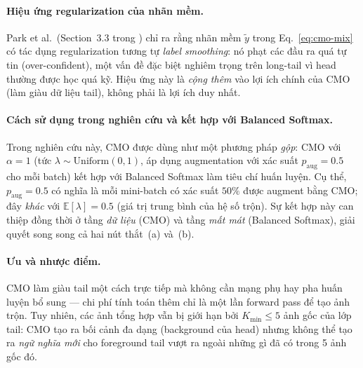 \paragraph{Hiệu ứng regularization của nhãn mềm.}
Park et al.\ (Section~3.3 trong \cite{park2022cmo}) chỉ ra rằng
nhãn mềm $\tilde{y}$ trong Eq.~\eqref{eq:cmo-mix} có tác dụng
regularization tương tự \emph{label smoothing}: nó phạt các đầu ra
quá tự tin (over-confident), một vấn đề đặc biệt nghiêm trọng trên
long-tail vì head thường được học quá kỹ.
Hiệu ứng này là \emph{cộng thêm} vào lợi ích chính của CMO
(làm giàu dữ liệu tail), không phải là lợi ích duy nhất.


\paragraph{Cách sử dụng trong nghiên cứu và kết hợp với Balanced Softmax.}
Trong nghiên cứu này, CMO được dùng như một phương pháp \emph{gộp}:
CMO với $\alpha=1$ (tức $\lambda \sim \mathrm{Uniform}(0,1)$,
áp dụng augmentation với xác suất $p_{\text{aug}}=0.5$ cho mỗi batch)
kết hợp với Balanced Softmax làm tiêu chí huấn luyện.
Cụ thể, $p_{\text{aug}}=0.5$ có nghĩa là mỗi mini-batch có xác suất
$50\%$ được augment bằng CMO; đây \emph{khác} với $\mathbb{E}[\lambda]=0.5$
(giá trị trung bình của hệ số trộn).
Sự kết hợp này can thiệp đồng thời ở tầng \emph{dữ liệu} (CMO)
và tầng \emph{mất mát} (Balanced Softmax),
giải quyết song song cả hai nút thắt~(a) và~(b).

\paragraph{Ưu và nhược điểm.}
CMO làm giàu tail một cách trực tiếp mà không cần mạng phụ hay
pha huấn luyện bổ sung --- chi phí tính toán thêm chỉ là
một lần forward pass để tạo ảnh trộn.
Tuy nhiên, các ảnh tổng hợp vẫn bị giới hạn bởi
$K_{\min} \leq 5$ ảnh gốc của lớp tail:
CMO tạo ra bối cảnh đa dạng (background của head)
nhưng không thể tạo ra \emph{ngữ nghĩa mới} cho foreground tail
vượt ra ngoài những gì đã có trong 5 ảnh gốc đó.


